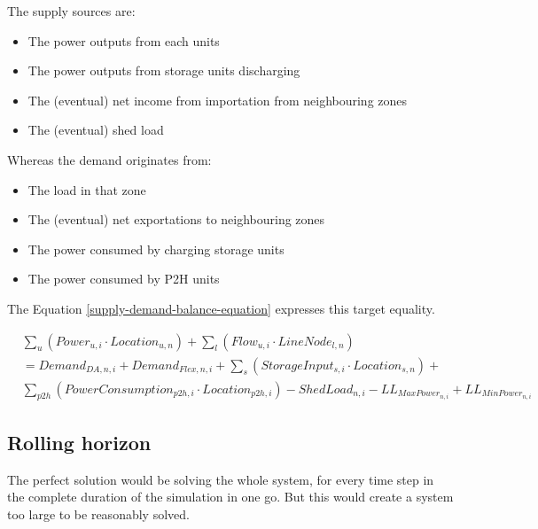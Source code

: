 The supply sources are:
\begin{itemize}
    \item The power outputs from each units 
    \item The power outputs from storage units discharging
    \item The (eventual) net income from importation from neighbouring zones
    \item The (eventual) shed load
\end{itemize}

Whereas the demand originates from:
\begin{itemize}
    \item The load in that zone
    \item The (eventual) net exportations to neighbouring zones
    \item The power consumed by charging storage units
    \item The power consumed by P2H units
\end{itemize}

The Equation \ref{supply-demand-balance-equation} expresses this target equality.

\begin{captionnable}
    \begin{equation}
        \begin{split}
            &\sum_{u} (Power_{u,i} \cdot Location_{u,n}) + \sum_{l} (Flow_{u,i} \cdot LineNode_{l,n})\\
            & = Demand_{DA,n,i} + Demand_{Flex,n,i} + \sum_{s} (StorageInput_{s,i} \cdot Location_{s,n}) + \\
            & \sum_{p2h}(PowerConsumption_{p2h,i} \cdot Location_{p2h,i}) - ShedLoad_{n,i} - LL_{MaxPower_{n,i}} + LL_{MinPower_{n,i}} 		
        \end{split}
        \label{supply-demand-balance-equation}
    \end{equation}
\end{captionnable}

\subsection{Rolling horizon}

The perfect solution would be solving the whole system, for every time step in the complete duration of the simulation in one go. But this would create a system too large to be reasonably solved.

